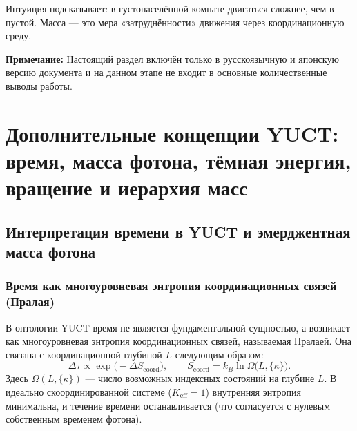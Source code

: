 \documentclass[12pt,a4paper]{article}
\begin{document}
Интуиция подсказывает: в густонаселённой комнате двигаться сложнее, чем в пустой. Масса — это мера «затруднённости» движения через координационную среду.

\vspace{0.5cm}
\noindent\textbf{Примечание:} Настоящий раздел включён только в русскоязычную и японскую версию документа и на данном этапе не входит в основные количественные выводы работы.

\section{Дополнительные концепции YUCT: время, масса фотона, тёмная энергия, вращение и иерархия масс}
\label{sec:additional_concepts_ru}

\subsection{Интерпретация времени в YUCT и эмерджентная масса фотона}
\label{subsec:time_photon_combined}

\subsubsection{Время как многоуровневая энтропия координационных связей (Пралая)}

В онтологии YUCT время не является фундаментальной сущностью, а возникает как многоуровневая энтропия координационных связей, называемая Пралаей. Она связана с координационной глубиной $L$ следующим образом:
\begin{equation}
	\Delta\tau \propto \exp\bigl(-\Delta S_{\mathrm{coord}}\bigr),\qquad
	S_{\mathrm{coord}} = k_B \ln\Omega\bigl(L,\{\kappa\}\bigr).
\end{equation}
Здесь $\Omega(L,\{\kappa\})$ — число возможных индексных состояний на глубине $L$. В идеально скоординированной системе ($K_{\mathrm{eff}}=1$) внутренняя энтропия минимальна, и течение времени останавливается (что согласуется с нулевым собственным временем фотона).
\end{document}
